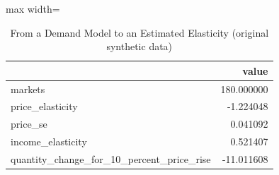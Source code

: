 \begin{table}[htbp]
\centering
\caption{From a Demand Model to an Estimated Elasticity (original synthetic data)}
\begingroup
\small
\setlength{\tabcolsep}{6pt}
\renewcommand{\arraystretch}{1.12}
\begin{adjustbox}{max width=\linewidth}
\begin{tabular}{@{}lr@{}}
\toprule
 & value \\
\midrule
markets & 180.000000 \\
price\_elasticity & -1.224048 \\
price\_se & 0.041092 \\
income\_elasticity & 0.521407 \\
quantity\_change\_for\_10\_percent\_price\_rise & -11.011608 \\
\bottomrule
\end{tabular}
\end{adjustbox}
\endgroup
\end{table}